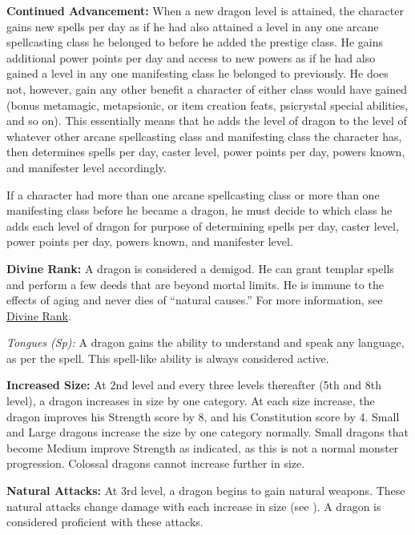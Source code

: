 {
\textbf{Continued Advancement:} When a new dragon level is attained, the character gains new spells per day as if he had also attained a level in any one arcane spellcasting class he belonged to before he added the prestige class. He gains additional power points per day and access to new powers as if he had also gained a level in any one manifesting class he belonged to previously. He does not, however, gain any other benefit a character of either class would have gained (bonus metamagic, metapsionic, or item creation feats, psicrystal special abilities, and so on). This essentially means that he adds the level of dragon to the level of whatever other arcane spellcasting class and manifesting class the character has, then determines spells per day, caster level, power points per day, powers known, and manifester level accordingly.

If a character had more than one arcane spellcasting class or more than one manifesting class before he became a dragon, he must decide to which class he adds each level of dragon for purpose of determining spells per day, caster level, power points per day, powers known, and manifester level.

\textbf{Divine Rank:} A dragon is considered a demigod. He can grant templar spells and perform a few deeds that are beyond mortal limits. He is immune to the effects of aging and never dies of ``natural causes.'' For more information, see \hyperref[Divine Rank]{Divine Rank}.

\textit{Tongues (Sp):} A dragon gains the ability to understand and speak any language, as per the  spell. This spell-like ability is always considered active.


\textbf{Increased Size:} At 2nd level and every three levels thereafter (5th and 8th level), a dragon increases in size by one category. At each size increase, the dragon improves his Strength score by 8, and his Constitution score by 4. Small and Large dragons increase the size by one category normally. Small dragons that become Medium improve Strength as indicated, as this is not a normal monster progression. Colossal dragons cannot increase further in size.

\textbf{Natural Attacks:} At 3rd level, a dragon begins to gain natural weapons. These natural attacks change damage with each increase in size (see ). A dragon is considered proficient with these attacks.

}
